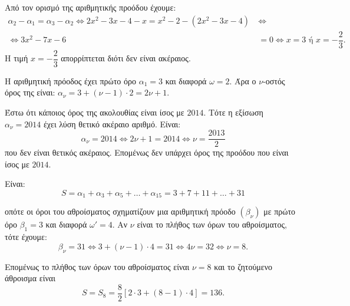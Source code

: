
\begin{alist}
\item Από τον ορισμό της αριθμητικής προόδου έχουμε:
\begin{align*}
\alpha_2 - \alpha_1 = \alpha_3 - \alpha_2 \Leftrightarrow 2x^2 - 3x - 4 - x = x^2 - 2 - (2x^2 - 3x - 4) \ &\Leftrightarrow \\
\Leftrightarrow 3x^2 - 7x - 6 &= 0 \Leftrightarrow x = 3 \text{ ή } x = -\dfrac{2}{3}.
\end{align*}
Η τιμή $x = -\dfrac{2}{3}$ απορρίπτεται διότι δεν είναι ακέραιος.

\item Η αριθμητική πρόοδος έχει πρώτο όρο $\alpha_1 = 3$ και διαφορά $\omega = 2$. Άρα ο $\nu$-οστός όρος της
είναι: $\alpha_\nu = 3 + (\nu - 1) \cdot 2 = 2\nu + 1$.

Έστω ότι κάποιος όρος της ακολουθίας είναι ίσος με $2014$. Τότε η εξίσωση $\alpha_\nu = 2014$ έχει
λύση θετικό ακέραιο αριθμό. Είναι:
\[\alpha_\nu = 2014 \Leftrightarrow 2\nu + 1 = 2014 \Leftrightarrow \nu = \dfrac{2013}{2}\]
που δεν είναι θετικός ακέραιος.
Επομένως δεν υπάρχει όρος της προόδου που είναι ίσος με $2014$.

\item Είναι:
\[S = \alpha_1 + \alpha_3 + \alpha_5 + \dots + \alpha_{15} = 3 + 7 + 11 + \dots + 31\]

οπότε οι όροι του αθροίσματος σχηματίζουν μια αριθμητική πρόοδο $(\beta_\nu)$ με πρώτο όρο
$\beta_1 = 3$ και διαφορά $\omega' = 4$. Αν $\nu$ είναι το πλήθος των όρων του αθροίσματος, τότε έχουμε:
\[\beta_\nu = 31 \Leftrightarrow 3 + (\nu - 1) \cdot 4 = 31 \Leftrightarrow 4\nu = 32 \Leftrightarrow \nu = 8.\]

Επομένως το πλήθος των όρων του αθροίσματος είναι $\nu = 8$ και το ζητούμενο άθροισμα είναι
\[S = S_8 = \dfrac{8}{2}[2 \cdot 3 + (8 - 1) \cdot 4] = 136.\]
\end{alist}

